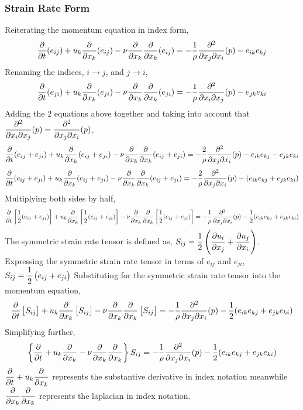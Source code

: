 \documentclass[a4paper, 12pt]{report}
\begin{document}
\begin{center}
\subsubsection{Strain Rate Form}
\begin{comment}
\end{comment}
Reiterating the momentum equation in index form,
$$\frac{\partial}{\partial t}(e_{ij}) + u_k\frac{\partial }{\partial x_k}(e_{ij}) - \nu\frac{\partial}{\partial x_k}\frac{\partial}{\partial x_k}(e_{ij}) = -\frac{1}{\rho}\frac{\partial^2}{\partial x_j\partial x_i}(p) - e_{ik}e_{kj}$$
Renaming the indices, $i\to j$, and $j\to i$,
$$\frac{\partial}{\partial t}(e_{ji}) + u_k\frac{\partial }{\partial x_k}(e_{ji}) - \nu\frac{\partial}{\partial x_k}\frac{\partial}{\partial x_k}(e_{ji}) = -\frac{1}{\rho}\frac{\partial^2}{\partial x_i\partial x_j}(p) - e_{jk}e_{ki}$$
Adding the $2$ equations above together and taking into account that $\displaystyle{\frac{\partial^2}{\partial x_i\partial x_j}(p)=\frac{\partial^2}{\partial x_j\partial x_i}(p)}$,
$$\frac{\partial}{\partial t}(e_{ij} + e_{ji}) + u_k\frac{\partial }{\partial x_k}(e_{ij} + e_{ji}) - \nu\frac{\partial}{\partial x_k}\frac{\partial}{\partial x_k}(e_{ij} + e_{ji}) = -\frac{2}{\rho}\frac{\partial^2}{\partial x_j\partial x_i}(p) - e_{ik}e_{kj} - e_{jk}e_{ki}$$
$$\frac{\partial}{\partial t}(e_{ij} + e_{ji}) + u_k\frac{\partial }{\partial x_k}(e_{ij} + e_{ji}) - \nu\frac{\partial}{\partial x_k}\frac{\partial}{\partial x_k}(e_{ij} + e_{ji}) = -\frac{2}{\rho}\frac{\partial^2}{\partial x_j\partial x_i}(p) - (e_{ik}e_{kj} + e_{jk}e_{ki})$$
Multiplying both sides by half,
$$\frac{\partial}{\partial t}\left[\frac{1}{2}(e_{ij}+e_{ji})\right] + u_k\frac{\partial }{\partial x_k}\left[\frac{1}{2}(e_{ij}+e_{ji})\right] - \nu\frac{\partial}{\partial x_k}\frac{\partial}{\partial x_k}\left[\frac{1}{2}(e_{ij}+e_{ji})\right] = -\frac{1}{\rho}\frac{\partial^2}{\partial x_j\partial x_i}(p) - \frac{1}{2}(e_{ik}e_{kj}+e_{jk}e_{ki})$$
The symmetric strain rate tensor is defined as, $\displaystyle{S_{ij} = \frac{1}{2}\left(\frac{\partial u_i}{\partial x_j}+\frac{\partial u_j}{\partial x_i}\right)}$. Expressing the symmetric strain rate tensor in terms of $e_{ij}$ and $e_{ji}$, $\displaystyle{S_{ij} = \frac{1}{2}\left(e_{ij}+e_{ji}\right)}$
Substituting for the symmetric strain rate tensor into the momentum equation,
$$\frac{\partial}{\partial t}\left[S_{ij}\right] + u_k\frac{\partial }{\partial x_k}\left[S_{ij}\right] - \nu\frac{\partial}{\partial x_k}\frac{\partial}{\partial x_k}\left[S_{ij}\right] = -\frac{1}{\rho}\frac{\partial^2}{\partial x_j\partial x_i}(p) - \frac{1}{2}(e_{ik}e_{kj}+e_{jk}e_{ki})$$
Simplifying further,
$$\left\{\frac{\partial}{\partial t} + u_k\frac{\partial }{\partial x_k} - \nu\frac{\partial}{\partial x_k}\frac{\partial}{\partial x_k}\right\}S_{ij} = -\frac{1}{\rho}\frac{\partial^2}{\partial x_j\partial x_i}(p) - \frac{1}{2}(e_{ik}e_{kj}+e_{jk}e_{ki})$$
$\displaystyle{\frac{\partial}{\partial t} + u_k\frac{\partial}{\partial x_k}}$ represents the substantive derivative in index notation meanwhile $\displaystyle{\frac{\partial}{\partial x_k}\frac{\partial}{\partial x_k}}$ represents the laplacian in index notation.

\end{center}
\end{document}
